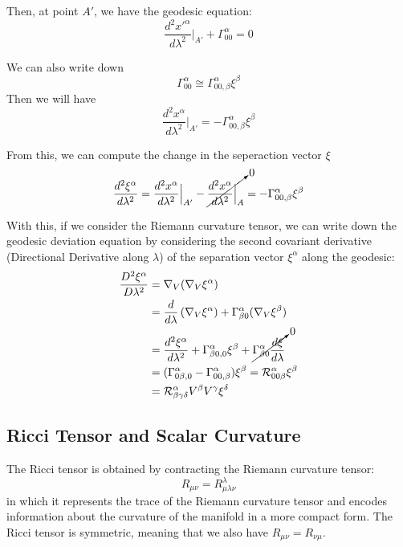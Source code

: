 \documentclass{article}
\newcommand{\Ric}{\mathcal{R}}
\begin{document}
Then, at point $A'$, we have the geodesic equation:
\begin{equation}
    \frac{d^2x'^\alpha}{d\lambda^2}\Big|_{A'}+\Gamma^\alpha_{00}=0
\end{equation}

We can also write down
\begin{equation}
    \Gamma^\alpha _{00}\cong \Gamma^\alpha_{00,\beta}\xi^\beta
\end{equation}
Then we will have
\begin{equation}
    \frac{d^2x^\alpha}{d\lambda^2}\Big|_{A'}=-\Gamma^\alpha_{00,\beta}\xi^\beta
\end{equation}

From this, we can compute the change in the seperaction vector $\xi$
\begin{equation}
    \frac{d^2\xi^\alpha}{d\lambda^2}=\frac{d^2x^\alpha}{d\lambda^2}\Big|_{A'}-\cancelto{0}{\frac{d^2x^\alpha}{d\lambda^2}\Big|_A}=-\Gamma^\alpha_{00,\beta}\xi^\beta
\end{equation}

With this, if we consider the Riemann curvature tensor, we can write down the geodesic deviation equation by considering the second covariant derivative (Directional Derivative along $\lambda$) of the separation vector $\xi^\alpha$ along the geodesic:
\begin{equation}
    \begin{split}
\frac{D^2 \xi^\alpha}{D \lambda^2} &= \nabla_V(\nabla_V \xi^\alpha)\\
&=\frac{d}{d\lambda}\left(\nabla_V \xi^\alpha \right)+\Gamma^\alpha_{\beta 0}(\nabla_V \xi^\beta)\\
&=\frac{d^2\xi^\alpha}{d\lambda^2}+\Gamma^\alpha_{\beta 0,0}\xi^\beta+\cancelto{0}{\Gamma^\alpha_{\beta0}\frac{d\xi}{d\lambda}}\\
&=(\Gamma^\alpha_{0\beta,0}-\Gamma^\alpha_{00,\beta})\xi^\beta=\Ric^\alpha_{00\beta}\xi^\beta\\
&=\Ric^\alpha_{\beta\gamma\delta} V^\beta V^\gamma \xi^\delta\\
    \end{split}
\end{equation}
\subsection{Ricci Tensor and Scalar Curvature}
The Ricci tensor is obtained by contracting the Riemann curvature tensor:
\begin{equation}
R_{\mu\nu} = R^\lambda_{\mu\lambda\nu}
\end{equation}
in which it represents the trace of the Riemann curvature tensor and encodes information about the curvature of the manifold in a more compact form. The Ricci tensor is symmetric, meaning that we also have $R_{\mu\nu} = R_{\nu\mu}$.
\end{document}
